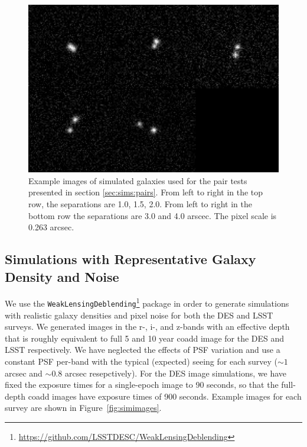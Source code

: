 \documentclass[fleqn,useAMS,usenatbib]{mnras}
\begin{document}
\begin{figure}
    \includegraphics[width=\textwidth]{figures/bdk-comb.png}
    \caption{Example images of simulated galaxies used for the pair tests
    presented in section \ref{sec:sims:pairs}.  From left to right in the top row,
    the separations are 1.0, 1.5, 2.0. From left to right in the bottom row the
    separations are 3.0 and 4.0 arscec. The pixel scale is 0.263 arcsec.
    \label{fig:pairs}}
\end{figure}

\subsection{Simulations with Representative Galaxy Density and Noise}
\label{sec:sims:realgals}

We use the \texttt{WeakLensingDeblending}\footnote{\url{https://github.com/LSSTDESC/WeakLensingDeblending}}
package in order to generate simulations with realistic galaxy densities and pixel noise for both the
DES and LSST surveys. We generated images in the r-, i-, and z-bands with an
effective depth that is roughly equivalent to full 5 and 10 year coadd image
for the DES and LSST respectively. We have neglected the effects of PSF
variation and use a constant PSF per-band with the typical
(expected) seeing for each survey ($\sim\!1$ arcsec and $\sim\!0.8$ arcsec resepctively).
For the DES image simulations, we have
fixed the exposure times for a single-epoch image to 90 seconds, so that
the full-depth coadd images have exposure times of 900 seconds. Example images
for each survey are shown in Figure~\ref{fig:simimages}.
\end{document}
